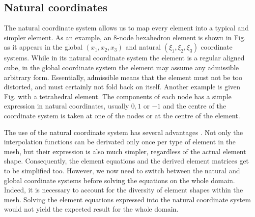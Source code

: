 	\subsection{Natural coordinates}
The natural coordinate system allows us to map every element into a typical and simpler element. As an example, an 8-node hexahedron element is shown in Fig.  as it appears in the global $(x_1, x_2, x_3)$ and natural $(\xi_1,\xi_2,\xi_3)$ coordinate systems. While in its natural coordinate system the element is a regular aligned cube, in the global coordinate system the element may assume any admissible arbitrary form. Essentially, admissible means that the element must not be too distorted, and must certainly not fold back on itself. Another example is given Fig.  with a tetrahedral element. The components of each node has a simple expression in natural coordinates, usually $0, 1$ or $-1$ and the centre of the coordinate system is taken at one of the nodes or at the centre of the element. 

The use of the natural coordinate system has several advantages \citep{Biswas76}. Not only the interpolation functions can be derivated only once per type of element in the mesh, but their expression is also much simpler, regardless of the actual element shape. Consequently, the element equations and the derived element matrices get to be simplified too. However, we now need to switch between the natural and global coordinate systems before solving the equations on the whole domain. Indeed, it is necessary to account for the diversity of element shapes within the mesh. Solving the element equations expressed into the natural coordinate system would not yield the expected result for the whole domain. 
	
	
